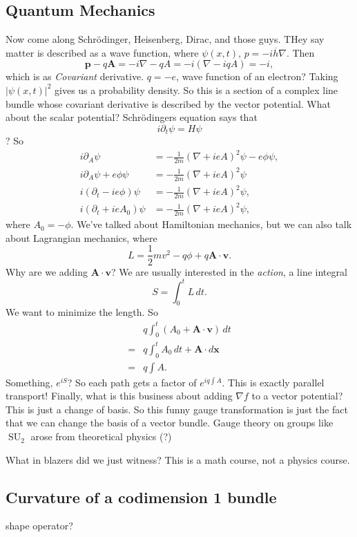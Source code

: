 \subsection{Quantum Mechanics}
Now come along Schr\"odinger, Heisenberg, Dirac, and those guys. THey say matter is described as a wave function, where $\psi(x,t)$, $p=-i \overline{h}\nabla.$ Then \[
\mathbf p-q \mathbf A=-i \nabla-qA=-i(\nabla-iqA)=-i,
\] which is as \emph{Covariant} derivative. $q=-e$, wave function of an electron? Taking $| \psi (x,t)|^2$ gives us a probability density. So this is a section of a complex line bundle whose covariant derivative is described by the vector potential. What about the scalar potential? Schr\"odingers equation says that \[
i \partial _t \psi =H\psi
\] ? So 
\begin{align*}
    i \partial _A \psi &= -\frac{1}{2m}\left( \nabla+ieA \right) ^2\psi -e\phi\psi,\\
    i\partial _A\psi+e\phi \psi &= -\frac{1}{2m}\left( \nabla+ieA \right) ^2\psi\\
    i(\partial _t-ie \phi)\psi&=-\frac{1}{2m}\left( \nabla+ieA \right) ^2\psi,\\
    i(\partial _t+ieA_0)\psi&=-\frac{1}{2m}(\nabla+ieA)^2\psi,
\end{align*}where $A_0=-\phi$.
We've talked about Hamiltonian mechanics, but we can also talk about Lagrangian mechanics, where \[
L=\frac{1}{2}mv^2-q\phi+q\mathbf A \cdot \mathbf v.
\] Why are we adding $\mathbf A\cdot \mathbf v$? We are usually interested in the \emph{action}, a line integral 
\[
S= \int_{0}^{t} L \, dt.
\] We want to minimize the length. So 
\begin{align*}
    &q \int_{0}^{t} (A_0+\mathbf A\cdot \mathbf v) \, dt\\
    =&q \int_{0}^{t} A_0\,dt + \mathbf A\cdot d \mathbf x \\
    =&q \int A .
\end{align*}Something, $e^{iS}$? So each path gets a factor of $e^{iq \int A }$. This is exactly parallel transport! Finally, what is this business about adding $\nabla f$ to a vector potential? This is just a change of basis. So this funny gauge transformation is just the fact that we can change the basis of a vector bundle. Gauge theory on groups like $\operatorname{SU}_2$ arose from theoretical physics (?)

What in blazers did we just witness? This is a math course, not a physics course.

\subsection{Curvature of a codimension 1 bundle}
shape operator?


